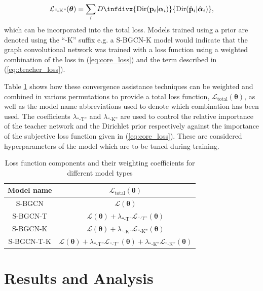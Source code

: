 \documentclass[journal]{IEEEtran}
\newcommand{\infdiv}{D\infdivx}
\begin{document}
\begin{equation}
    \mathcal{L}_{\text{``-K''}}(\boldsymbol{\theta})=\sum_i\infdiv{\text{Dir}(\mathbf{p}_i\vert\boldsymbol{\alpha}_i)}{\text{Dir}(\hat{\mathbf{p}}_i\vert\hat{\boldsymbol{\alpha}}_i)},
\label{eq::teacher_loss}
\end{equation}
which can be incorporated into the total loss. Models trained using a prior are denoted using the ``-K'' suffix e.g. a S-BGCN-K model would indicate that the graph convolutional network was trained with a loss function using a weighted combination of the loss in (\ref{eq:core_loss}) and the term described in (\ref{eq::teacher_loss}).

Table \ref{loss_table} shows how these convergence assistance techniques can be weighted and combined in various permutations to provide a total loss function, $\mathcal{L}_\text{total}(\boldsymbol{\theta})$, as well as the model name abbreviations used to denote which combination has been used. The coefficients $\lambda_{\text{``-T''}}$ and $\lambda_{\text{``-K''}}$ are used to control the relative importance of the teacher network and the Dirichlet prior respectively against the importance of the subjective loss function given in (\ref{eq:core_loss}). These are considered hyperparameters of the model which are to be tuned during training.


\begin{table}
\renewcommand{\arraystretch}{1.5}
\caption{Loss function components and their weighting coefficients for different model types}
\label{loss_table}
\centering
\begin{tabular}{cc}
\hline
\bfseries Model name & \bfseries $\mathcal{L}_{\text{total}}(\boldsymbol{\theta})$\\
\hline
S-BGCN & $\mathcal{L}(\boldsymbol{\theta})$ \\
S-BGCN-T & $\mathcal{L}(\boldsymbol{\theta})+\lambda_{\text{``-T''}}\mathcal{L}_{\text{``-T''}}(\boldsymbol{\theta})$ \\
S-BGCN-K & $\mathcal{L}(\boldsymbol{\theta})+\lambda_{\text{``-K''}}\mathcal{L}_{\text{``-K''}}(\boldsymbol{\theta})$ \\
S-BGCN-T-K & $\mathcal{L}(\boldsymbol{\theta})+\lambda_{\text{``-T''}}\mathcal{L}_{\text{``-T''}}(\boldsymbol{\theta})+\lambda_{\text{``-K''}}\mathcal{L}_{\text{``-K''}}(\boldsymbol{\theta})$ \\
\hline
\end{tabular}
\end{table}

\section{Results and Analysis}
\label{sec::results}
\end{document}
